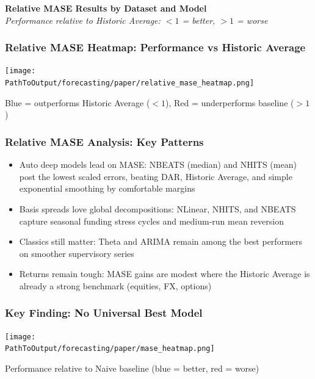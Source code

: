 \documentclass[ignorenonframetext, 9pt]{beamer}
\begin{document}
  \begin{frame}[plain]
    \tiny
    \vspace{-0.2cm}
    \centering
    \textbf{Relative MASE Results by Dataset and Model}\\
    {\scriptsize \textit{Performance relative to Historic Average: $<1$ = better, $>1$ = worse}}\\
    \vspace{0.2cm}
    \resizebox{0.98\textwidth}{!}{}
  \end{frame}

\begin{frame}
  \frametitle{Relative MASE Heatmap: Performance vs Historic Average}
  \centering
  \texttt{[image: \\PathToOutput/forecasting/paper/relative\_mase\_heatmap.png]}
  \vspace{0.2cm}

  Blue = outperforms Historic Average ($<1$), Red = underperforms baseline ($>1$)
\end{frame}

\begin{frame}
  \frametitle{Relative MASE Analysis: Key Patterns}
  \begin{itemize}
  \item \alert{Auto deep models lead on MASE:} NBEATS (median) and NHITS (mean) post the lowest scaled errors, beating DAR, Historic Average, and simple exponential smoothing by comfortable margins
  \vspace{0.3cm}
  \item \alert{Basis spreads love global decompositions:} NLinear, NHITS, and NBEATS capture seasonal funding stress cycles and medium-run mean reversion
  \vspace{0.3cm}
  \item \alert{Classics still matter:} Theta and ARIMA remain among the best performers on smoother supervisory series
  \vspace{0.3cm}
  \item \alert{Returns remain tough:} MASE gains are modest where the Historic Average is already a strong benchmark (equities, FX, options)
  \end{itemize}
\end{frame}

\begin{frame}
  \frametitle{Key Finding: No Universal Best Model}
  \centering
  \texttt{[image: \\PathToOutput/forecasting/paper/mase\_heatmap.png]}
  \vspace{0.2cm}

  Performance relative to Naive baseline (blue = better, red = worse)
\end{frame}
\end{document}
